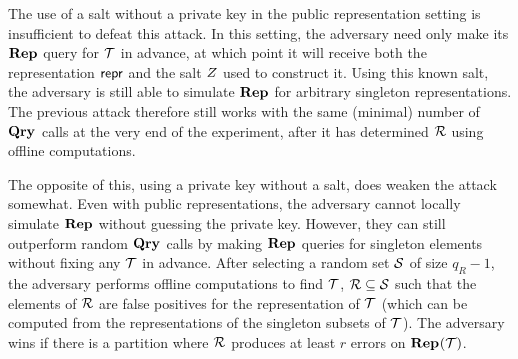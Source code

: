 The use of a salt without a private key in the public representation setting is insufficient to defeat this attack. In this setting, the adversary need only make its $\mathbf{Rep}\hspace{0.5pt}$ query for $\mathcal{T}$ in advance, at which point it will receive both the representation $\mathsf{repr}$ and the salt $Z$ used to construct it. Using this known salt, the adversary is still able to simulate $\mathbf{Rep}\hspace{0.5pt}$ for arbitrary singleton representations. The previous attack therefore still works with the same (minimal) number of $\mathbf{Qry}\hspace{0.5pt}$ calls at the very end of the experiment, after it has determined $\mathcal{R}$ using offline computations.

The opposite of this, using a private key without a salt, does weaken the attack somewhat. Even with public representations, the adversary cannot locally simulate $\mathbf{Rep}\hspace{0.5pt}$ without guessing the private key. However, they can still outperform random $\mathbf{Qry}\hspace{0.5pt}$ calls by making $\mathbf{Rep}\hspace{0.5pt}$ queries for singleton elements without fixing any $\mathcal{T}$ in advance. After selecting a random set $\mathcal{S}$ of size $q_R-1$, the adversary performs offline computations to find $\mathcal{T}$, $\mathcal{R} \subseteq \mathcal{S}$ such that the elements of $\mathcal{R}$ are false positives for the representation of $\mathcal{T}$ (which can be computed from the representations of the singleton subsets of $\mathcal{T}$). The adversary wins if there is a partition where $\mathcal{R}$ produces at least $r$ errors on $\mathbf{Rep}\hspace{0.5pt}(\mathcal{T})$.


